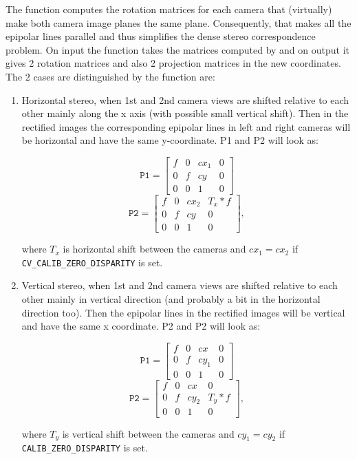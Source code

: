The function computes the rotation matrices for each camera that (virtually) make both camera image planes the same plane. Consequently, that makes all the epipolar lines parallel and thus simplifies the dense stereo correspondence problem. On input the function takes the matrices computed by  and on output it gives 2 rotation matrices and also 2 projection matrices in the new coordinates. The 2 cases are distinguished by the function are: 

\begin{enumerate}
\item Horizontal stereo, when 1st and 2nd camera views are shifted relative to each other mainly along the x axis (with possible small vertical shift). Then in the rectified images the corresponding epipolar lines in left and right cameras will be horizontal and have the same y-coordinate. P1 and P2 will look as: 

\[\texttt{P1}=
\begin{bmatrix}
f & 0 & cx_1 & 0\\
0 & f & cy & 0\\
0 & 0 & 1 & 0
\end{bmatrix}
\]
\[\texttt{P2}=
\begin{bmatrix}
f & 0 & cx_2 & T_x*f\\
0 & f & cy & 0\\
0 & 0 & 1 & 0
\end{bmatrix}
,
\]

where $T_x$ is horizontal shift between the cameras and $cx_1=cx_2$ if \texttt{CV\_CALIB\_ZERO\_DISPARITY} is set.
\item Vertical stereo, when 1st and 2nd camera views are shifted relative to each other mainly in vertical direction (and probably a bit in the horizontal direction too). Then the epipolar lines in the rectified images will be vertical and have the same x coordinate. P2 and P2 will look as:

\[
\texttt{P1}=
\begin{bmatrix}
f & 0 & cx & 0\\
0 & f & cy_1 & 0\\
0 & 0 & 1 & 0
\end{bmatrix}
\]
\[
\texttt{P2}=
\begin{bmatrix}
f & 0 & cx & 0\\
0 & f & cy_2 & T_y*f\\
0 & 0 & 1 & 0
\end{bmatrix}
,
\]

where $T_y$ is vertical shift between the cameras and $cy_1=cy_2$ if \texttt{CALIB\_ZERO\_DISPARITY} is set.
\end{enumerate} 

